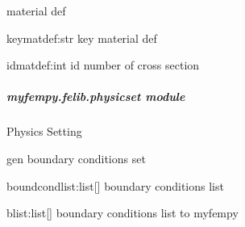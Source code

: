 \documentclass[letterpaper,10pt,english]{sphinxmanual}
\begin{document}

\begin{fulllineitems}
\label{\detokenize{myfempy.felib:myfempy.felib.materset.mat_def}}
\pysigstartsignatures
{}
\pysigstopsignatures
\sphinxAtStartPar
material def
\begin{description}
\sphinxAtStartPar
keymatdef:str \textendash{} key material def

\sphinxAtStartPar
idmatdef:int  \textendash{} id number of cross section

\end{description}

\end{fulllineitems}



\subparagraph{myfempy.felib.physicset module}
\label{\detokenize{myfempy.felib:module-myfempy.felib.physicset}}\label{\detokenize{myfempy.felib:myfempy-felib-physicset-module}}
\sphinxAtStartPar
Physics Setting

\begin{fulllineitems}
\label{\detokenize{myfempy.felib:myfempy.felib.physicset.gen_bound}}
\pysigstartsignatures
{}
\pysigstopsignatures
\sphinxAtStartPar
gen boundary conditions set
\begin{description}
\sphinxAtStartPar
boundcondlist:list{[}{]} \textendash{} boundary conditions list

\sphinxAtStartPar
blist:list{[}{]}         \textendash{} boundary conditions list to myfempy

\end{description}

\end{fulllineitems}
\end{document}

